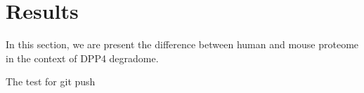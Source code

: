 \section{Results}
In this section, we are present the difference between human and mouse proteome in the context of DPP4 degradome. 

The test for git push

